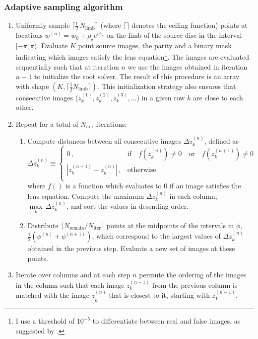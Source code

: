 \documentclass[12pt,dvipsnames]{report}
\begin{document}
\subsubsection{Adaptive sampling algorithm}
\begin{enumerate}
    \item Uniformly sample $\lceil\frac{1}{2}\,N_\mathrm{limb}\rceil$ (where $\lceil\rceil$ 
    denotes the ceiling function) points at locations 
    $w^{(n)}=w_0 + \rho_\star e^{i\phi_n}$ on the limb of the source disc  in 
    the interval $[-\pi,\pi)$. Evaluate $K$ point source images, the parity and a binary
    mask indicating which images satisfy the lens equation\footnote{I use a threshold of 
    $10^{-5}$ to differentiate between real and false images, as suggested by 
    \citet{2021MNRAS.503.6143K}.}. The images are evaluated sequentially such that at iteration
    $n$ we use the images obtained in iteration $n-1$ to initialize the root solver.
    The result of this procedure is an array with shape 
     $(K, \lceil\frac{1}{2}N_\mathrm{limb}\rceil)$. This initialization strategy also 
     ensures that consecutive images ($z^{(1)}_k, z^{(2)}_k, z^{(3)}_k,\ldots$) in a given row $k$ 
     are close to each other. 
    \item Repeat for a total of $N_\mathrm{iter}$ iterations:
    \begin{enumerate}
    \item Compute distances between all consecutive images $\Delta z^{(n)}_k$, defined as
    \begin{equation}
    \Delta z^{(n)}_k  \equiv 
    \begin{cases} 
    0\,,& \text{if}\quad f\left(z^{(n)}_k\right)\neq 0\quad \text{or}\quad f\left(z^{(n+1)}_k\right)\neq 0\;\text{}\\
    |z^{(n+1)}_k - z^{(n)}_k|\,,&\text{otherwise}\\
    \end{cases} 
    \end{equation}
    where $f()$ is a function which evaluates to $0$ if an image satisfies the lens equation.
    Compute the maximum $\Delta z^{(n)}_k$ in each column, 
    $\underset{k}{\operatorname{max}}\,\Delta z^{(n)}_k$, and sort the values in desending 
    order. 
    \item Distribute $\lceil N_\mathrm{remain}/N_\mathrm{iter}\rceil$ points at the midpoints of the intervals 
    in $\phi$, $\frac{1}{2}(\phi^{(n)}+\phi^{(n+1)})$, which correspond to the largest values of
    $\Delta z^{(n)}_k$  obtained in the previous step. Evaluate a new set of images at these points.
\end{enumerate}
    \item Iterate over columns and at each step $n$ permute the ordering of the 
    images in the column such that each image $z^{(n-1)}_k$ from the previous column is 
    matched with  the image  $z^{(n)}_{k^\prime}$ that is closest to it, starting with $z^{(n-1)}_1$.
\end{enumerate}
\end{document}
